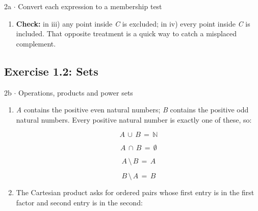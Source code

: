 \documentclass[11pt]{article}
\begin{document}
\begin{keepsection}
\begin{workedbox}{2a \ensuremath{\cdot} Convert each expression to a membership test}
\begin{enumerate}
\begin{equation*}(({A}\, \setminus \, {C})\, \cup \, ({B}\, \setminus \, {C}))^{\mathrm{c}}\, =\, (({A}\, \cup \, {B})\, \setminus \, {C})^{\mathrm{c}}\, =\, ({A}\, \cup \, {B})^{\mathrm{c}}\, \cup \, {C}\end{equation*}
\item \textbf{Check:} in iii) any point inside \textit{C} is excluded; in iv) every point inside \textit{C} is included. That opposite treatment is a quick way to catch a misplaced complement.
\end{enumerate}
\end{workedbox}

\end{keepsection}
\begin{keepsection}\subsection{Exercise 1.2: Sets}

\begin{workedbox}{2b \ensuremath{\cdot} Operations, products and power sets}
\begin{enumerate}
\item {}
\textit{A} contains the positive even natural numbers; \textit{B} contains the positive odd natural numbers. Every positive natural number is exactly one of these, so:

\begin{equation*}{A}\, \cup \, {B}\, =\, \mathbb{N}\end{equation*}

\begin{equation*}{A}\, \cap \, {B}\, =\, \emptyset \end{equation*}

\begin{equation*}{A}\, \setminus \, {B}\, =\, {A}\end{equation*}

\begin{equation*}{B}\, \setminus \, {A}\, =\, {B}\end{equation*}
\item {}
The Cartesian product asks for ordered pairs whose first entry is in the first factor and second entry is in the second:


\end{enumerate}
\end{workedbox}
\end{keepsection}
\end{document}
